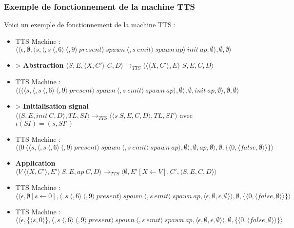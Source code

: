 \documentclass[10pt,a4paper]{article}
\begin{document}
		
		
			\subsubsection{Exemple de fonctionnement de la machine TTS}\label{TTS}
				
				Voici un exemple de fonctionnement de la machine TTS :	
				
				\begin{itemize}
					\item[] TTS Machine : $\langle\langle \epsilon,\emptyset,\langle s,\langle ,s~\langle,6\rangle~\langle,9\rangle~present\rangle~spawn~\langle ,s~emit\rangle~spawn~ap\rangle~init~ap,\emptyset\rangle,\emptyset,\emptyset\rangle$
					\item[] > \textbf{Abstraction} 	$\langle S,E,\langle X,C'\rangle$ $C,D\rangle
					\longrightarrow_{TTS} 
					\langle \langle\langle X,C'\rangle,E\rangle$ $S,E,C,D\rangle$
					\item[] TTS Machine : $\langle\langle \langle\langle s,\langle ,s~\langle,6\rangle~\langle,9\rangle~present\rangle~spawn~\langle ,s~emit\rangle~spawn~ap\rangle,\emptyset\rangle,\emptyset,init~ap,\emptyset\rangle,\emptyset,\emptyset\rangle$
					\item[] > \textbf{Initialisation signal} $\langle\langle S,E,init~C,D\rangle,TL,SI\rangle 
					\longrightarrow_{TTS}
					\langle\langle s~S,E,C,D\rangle,TL,SI'\rangle$
					avec $\iota(SI) = (s,SI')$
					\item[] TTS Machine : $\langle\langle 0~\langle\langle s,\langle ,s~\langle,6\rangle~\langle,9\rangle~present\rangle~spawn~\langle ,s~emit\rangle~spawn~ap\rangle,\emptyset\rangle,\emptyset,ap,\emptyset\rangle,\emptyset,\{\langle 0,\langle false,\emptyset\rangle\rangle\}\rangle$ 
					\item[] \textbf{Application} $\langle V~\langle\langle X,C'\rangle,E'\rangle~S,E,ap~C,D\rangle
					\longrightarrow_{TTS} 
					\langle \emptyset,E'[X \leftarrow V],C',\langle S,E,C,D\rangle\rangle$
					\item[] TTS Machine : $\langle\langle\epsilon,\emptyset[s \leftarrow 0],\langle ,s~\langle,6\rangle~\langle,9\rangle~present\rangle~spawn~\langle ,s~emit\rangle~spawn~ap,\langle \epsilon,\emptyset,\epsilon,\emptyset\rangle\rangle,\emptyset,\{\langle 0,\langle false,\emptyset\rangle\rangle\}\rangle$ 
					\item[] TTS Machine : $\langle\langle\epsilon,\{\langle s,0\rangle\},\langle ,s~\langle,6\rangle~\langle,9\rangle~present\rangle~spawn~\langle ,s~emit\rangle~spawn~ap,\langle \epsilon,\emptyset,\epsilon,\emptyset\rangle\rangle,\emptyset,\{\langle 0,\langle false,\emptyset\rangle\rangle\}\rangle$ 

\end{itemize}
\end{document}
